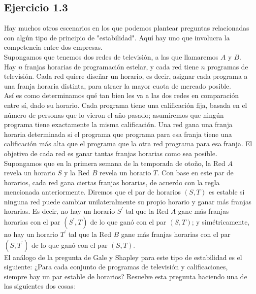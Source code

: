 \documentclass{article}
\begin{document}
\newpage

\subsection{Ejercicio 1.3}
Hay muchos otros escenarios en los que podemos plantear preguntas relacionadas con algún tipo de principio de "estabilidad". Aquí hay uno que involucra la competencia entre dos empresas.\\

Supongamos que tenemos dos redes de televisión, a las que llamaremos $A$ y $B$. Hay $n$ franjas horarias de programación estelar, y cada red tiene $n$ programas de televisión. Cada red quiere diseñar un horario, es decir, asignar cada programa a una franja horaria distinta, para atraer la mayor cuota de mercado posible.\\

Así es como determinamos qué tan bien les va a las dos redes en comparación entre sí, dado su horario. Cada programa tiene una calificación fija, basada en el número de personas que lo vieron el año pasado; asumiremos que ningún programa tiene exactamente la misma calificación. Una red gana una franja horaria determinada si el programa que programa para esa franja tiene una calificación más alta que el programa que la otra red programa para esa franja. El objetivo de cada red es ganar tantas franjas horarias como sea posible.\\

Supongamos que en la primera semana de la temporada de otoño, la Red $A$ revela un horario $S$ y la Red $B$ revela un horario $T$. Con base en este par de horarios, cada red gana ciertas franjas horarias, de acuerdo con la regla mencionada anteriormente. Diremos que el par de horarios $(S, T)$ es estable si ninguna red puede cambiar unilateralmente su propio horario y ganar más franjas horarias. Es decir, no hay un horario $S^{'}$ tal que la Red $A$ gane más franjas horarias con el par $(S^{'}, T)$ de lo que ganó con el par $(S, T)$; y simétricamente, no hay un horario $T^{'}$ tal que la Red $B$ gane más franjas horarias con el par $(S, T^{'})$ de lo que ganó con el par $(S, T)$.\\

El análogo de la pregunta de Gale y Shapley para este tipo de estabilidad es el siguiente: ¿Para cada conjunto de programas de televisión y calificaciones, siempre hay un par estable de horarios? Resuelve esta pregunta haciendo una de las siguientes dos cosas:\\
\end{document}
